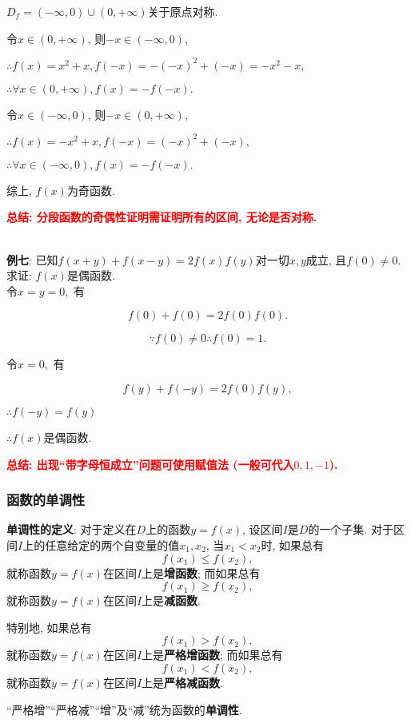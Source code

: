 \documentclass[8pt]{article}
\begin{document}
					$D_f = (-\infty, 0)\cup(0, +\infty)$关于原点对称.

					令$x\in(0, +\infty)$, 则$-x\in(-\infty, 0)$,

					$\therefore f(x)=x^2+x, f(-x)=-(-x)^2+(-x)=-x^2-x,$

					$\therefore \forall x\in(0, +\infty), f(x)=-f(-x).$

					令$x\in(-\infty, 0)$, 则$-x\in(0, +\infty)$,

					$\therefore f(x)=-x^2+x, f(-x)=(-x)^2+(-x),$

					$\therefore \forall x\in(-\infty, 0), f(x)=-f(-x).$

					综上, $f(x)$为奇函数.

					\textbf{\textcolor{red}{总结: 分段函数的奇偶性证明需证明所有的区间, 无论是否对称.}}

				~\\

				\textbf{例七}: 已知$f(x+y)+f(x-y)=2f(x)f(y)$对一切$x, y$成立, 且$f(0)\neq 0$. 求证: $f(x)$是偶函数.
					~\\

					令$x=y=0,$ 有

					$$f(0)+f(0)=2f(0)f(0).$$

					$$\because f(0) \neq 0 \therefore f(0) = 1.$$

					令$x=0,$ 有

					$$f(y)+f(-y)=2f(0)f(y),$$

					$\therefore f(-y)=f(y)$

					$\therefore f(x)$是偶函数.

					\textbf{\textcolor{red}{总结: 出现“带字母恒成立”问题可使用赋值法 (一般可代入$0, 1, -1$).}}

			\subsubsection{函数的单调性}
				\textbf{单调性的定义}: 对于定义在$D$上的函数$y=f(x)$, 设区间$I$是$D$的一个子集. 对于区间$I$上的任意给定的两个自变量的值$x_1, x_2$, 当$x_1 < x_2$时, 如果总有$$f(x_1)\leq f(x_2),$$就称函数$y=f(x)$在区间$I$上是\textbf{增函数}; 而如果总有$$f(x_1)\geq f(x_2),$$就称函数$y=f(x)$在区间$I$上是\textbf{减函数}.

				特别地, 如果总有$$f(x_1) > f(x_2),$$就称函数$y=f(x)$在区间$I$上是\textbf{严格增函数}; 而如果总有$$f(x_1) < f(x_2),$$就称函数$y=f(x)$在区间$I$上是\textbf{严格减函数}.

				“严格增”“严格减”“增”及“减”统为函数的\textbf{单调性}.\\
\end{document}
